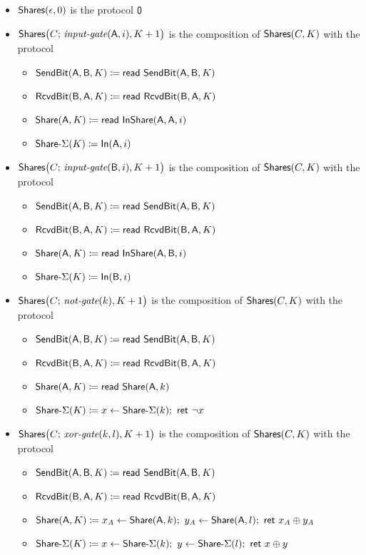 \begin{itemize}
\item $\Shares(\epsilon,0)$ is the protocol $\zero$

\item $\Shares\big(C; \, \inputgate(\A,i),K+1\big)$ is the composition of $\Shares(C,K)$ with the protocol
\begin{itemize}
\item $\SendBit(\A,\B,K) \coloneqq \read{\SendBit(\A,\B,K)}$
\item $\RcvdBit(\B,\A,K) \coloneqq \read{\RcvdBit(\B,\A,K)}$
\item $\Share(\A,K) \coloneqq \read{\InShare(\A,\A,i)}$
\item $\SumShare(K) \coloneqq \In(\A,i)$
\end{itemize}

\item $\Shares\big(C; \, \inputgate(\B,i),K+1\big)$ is the composition of $\Shares(C,K)$ with the protocol
\begin{itemize}
\item $\SendBit(\A,\B,K) \coloneqq \read{\SendBit(\A,\B,K)}$
\item $\RcvdBit(\B,\A,K) \coloneqq \read{\RcvdBit(\B,\A,K)}$
\item $\Share(\A,K) \coloneqq \read{\InShare(\A,\B,i)}$
\item $\SumShare(K) \coloneqq \In(\B,i)$
\end{itemize}

\item $\Shares\big(C; \, \notgate(k),K+1\big)$ is the composition of $\Shares(C,K)$ with the protocol
\begin{itemize}
\item $\SendBit(\A,\B,K) \coloneqq \read{\SendBit(\A,\B,K)}$
\item $\RcvdBit(\B,\A,K) \coloneqq \read{\RcvdBit(\B,\A,K)}$
\item $\Share(\A,K) \coloneqq \read{\Share(\A,k)}$
\item $\SumShare(K) \coloneqq x \leftarrow \SumShare(k); \ \ret{\neg x}$
\end{itemize}

\item $\Shares\big(C; \, \xorgate(k,l),K+1\big)$ is the composition of $\Shares(C,K)$ with the protocol
\begin{itemize}
\item $\SendBit(\A,\B,K) \coloneqq \read{\SendBit(\A,\B,K)}$
\item $\RcvdBit(\B,\A,K) \coloneqq \read{\RcvdBit(\B,\A,K)}$
\item $\Share(\A,K) \coloneqq x_A \leftarrow \Share(\A,k); \ y_A \leftarrow \Share(\A,l); \ \ret{x_A \oplus y_A}$
\item $\SumShare(K) \coloneqq x \leftarrow \SumShare(k); \ y \leftarrow \SumShare(l); \ \ret{x \oplus y}$
\end{itemize}


\end{itemize}
